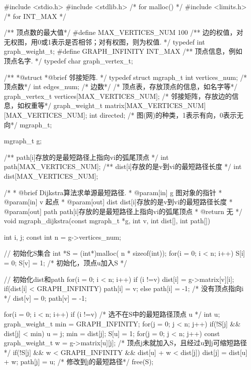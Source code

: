 \begin{Codex}[label=mgraph_dijkstra.c]
#include <stdio.h>
#include <stdlib.h>  /* for malloc() */
#include <limits.h>  /* for INT_MAX */

/** 顶点数的最大值*/
#define MAX_VERTICES_NUM 100
/** 边的权值，对无权图，用0或1表示是否相邻；对有权图，则为权值. */
typedef int graph_weight_t;
#define GRAPH_INFINITY INT_MAX
/** 顶点信息，例如顶点名字. */
typedef char graph_vertex_t;

/**
 *@struct
 *@brief 邻接矩阵.
 */
typedef struct mgraph_t {
    int vertices_num; /* 顶点数*/
    int edges_num; /* 边数*/
    /* 顶点表，存放顶点的信息，如名字等*/
    graph_vertex_t vertices[MAX_VERTICES_NUM];
    /* 邻接矩阵，存放边的信息，如权重等*/
    graph_weight_t matrix[MAX_VERTICES_NUM][MAX_VERTICES_NUM];
    int directed; /* 图(网)的种类，1表示有向，0表示无向*/
} mgraph_t;

mgraph_t g;

/** path[i]存放的是最短路径上指向vi的弧尾顶点 */
int path[MAX_VERTICES_NUM];
/** dist[i]存放的是v到vi的最短路径长度 */
int dist[MAX_VERTICES_NUM];


/*
  * @brief Dijkstra算法求单源最短路径.
  * @param[in] g 图对象的指针
  * @param[in] v 起点
  * @param[out] dist dist[i]存放的是v到vi的最短路径长度
  * @param[out] path path[i]存放的是最短路径上指向vi的弧尾顶点
  * @return 无
  */
void mgraph_dijkstra(const mgraph_t *g, int v, int dist[], int path[]) {
    int i, j;
    const int n = g->vertices_num;

    // 初始化S集合
    int *S = (int*)malloc( n * sizeof(int));
    for(i = 0; i < n; i++) S[i] = 0;
    S[v] = 1; /* 初始化，顶点u加入S */

    // 初始化dist和path
    for(i = 0; i < n; i++) if (i !=v) {
        dist[i] = g->matrix[v][i];
        if(dist[i] < GRAPH_INFINITY) {
            path[i] = v;
        }  else {
            path[i] = -1; /* 没有顶点指向i */
        }
    }
    dist[v] = 0;
    path[v] = -1;

    for(i = 0; i < n; i++) if (i !=v) {
        /* 选不在S中的最短路径顶点 u */
        int u;
        graph_weight_t min = GRAPH_INFINITY;
        for(j = 0; j < n; j++) {
            if(!S[j] && dist[j] < min) {
                u = j;
                min = dist[j];
            }
        }
        S[u] = 1;
        for(j = 0; j < n; j++) {
            const graph_weight_t w = g->matrix[u][j];
            /* 顶点j未就加入S，且经过u到j可缩短路径*/
            if(!S[j] && w < GRAPH_INFINITY &&
                dist[u] + w < dist[j]) {
                dist[j] = dist[u] + w;
                path[j] = u; /* 修改到j的最短路径*/
            }
        }
    }
    free(S);
}


\end{Codex}

